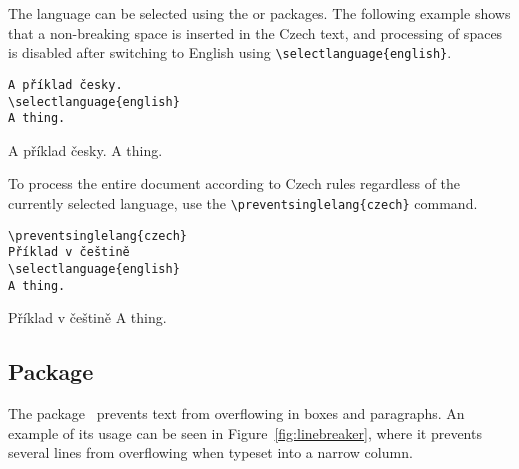 \documentclass{ltugboat}
\begin{document}
The language can be selected using the  or 
packages. The following example shows that a non-breaking space is inserted in
the Czech text, and processing of spaces is disabled after switching to English
using \verb|\selectlanguage{english}|.

\begin{verbatim}
A příklad česky.
\selectlanguage{english}
A thing.
\end{verbatim}

\preventsingledebugon

\noindent 
A příklad česky.
A thing.

\preventsingledebugoff



\bigskip

To process the entire document according to Czech rules regardless of the currently selected language, use the \verb|\preventsinglelang{czech}| command.

\begin{verbatim}
\preventsinglelang{czech}
Příklad v češtině
\selectlanguage{english}
A thing.
\end{verbatim}

\preventsingledebugon

\noindent Příklad v češtině
A thing.

\preventsingledebugoff

\subsection{ Package}

\newcommand\testbox[1]{%
  \parbox{120pt}{%
    \parindent=15pt%
    \tolerance=1%
    \pretolerance=1%
    #1
  }%
}

\newcommand\printtest[1]{%
  \linebreakerdisable%
  \begin{subfigure}[b]{.45\textwidth}
    \centering
  \noindent\testbox{%
    #1
  }%
  \caption{Without the \tbcode{Linebreaker} package}
  \end{subfigure}
  \linebreakerenable%
  \hfill%
  \begin{subfigure}[b]{.45\textwidth}
    \centering
  \testbox{%
    #1
  }%
  \medskip
  \caption{With the \tbcode{Linebreaker} package}
  \end{subfigure}
}

The  package~\cite{linebreaker} prevents text from overflowing in boxes and paragraphs. An example of its usage can be seen in Figure~\ref{fig:linebreaker}, where it prevents several lines from overflowing when typeset into a narrow column.
\end{document}

